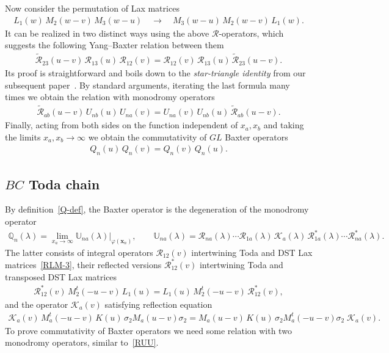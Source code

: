 \documentclass[11pt]{article}
\numberwithin{equation}{section}
\theoremstyle{plain}
\theoremstyle{definition}
\newcommand{\QQ}{\mathbb{Q}}
\newcommand{\MO}{U}
\newcommand{\MMO}{\mathbb{U}}
\renewcommand{\phi}{\varphi}
\begin{document}
Now consider the permutation of Lax matrices
\begin{align}
	L_1(w) \, M_2(w - v) \, M_3(w - u ) \quad \longrightarrow \quad M_3(w - u) \, M_2(w - v) \, L_1(w).
\end{align}
It can be realized in two distinct ways using the above $\mathcal{R}$-operators, which suggests the following Yang--Baxter relation between them
\begin{align}\label{RhRR}
	\widetilde{\mathcal{R}}_{23}(u - v) \, \mathcal{R}_{13}(u) \, \mathcal{R}_{12}(v) = \mathcal{R}_{12}(v) \, \mathcal{R}_{13}(u) \, \widetilde{\mathcal{R}}_{23}(u - v).
\end{align}
Its proof is straightforward and boils down to the \textit{star-triangle identity} from our subsequent paper~\cite{BDK}. By standard arguments, iterating the last formula many times we obtain the relation with monodromy operators
\begin{align} \label{RUU}
	\widetilde{\mathcal{R}}_{ab}(u - v) \, \MO_{nb}(u) \, \MO_{na}(v) = \MO_{na}(v) \, \MO_{nb}(u) \, \widetilde{\mathcal{R}}_{a b}(u - v).
\end{align}
Finally, acting from both sides on the function independent of $x_a, x_b$ and taking the limits $x_a, x_b \to \infty$ we obtain the commutativity of $GL$ Baxter operators
\begin{align}
	Q_n(u) \, Q_n(v) = Q_n(v) \, Q_n(u).
\end{align}

\subsection{$BC$ Toda chain}

By definition~\eqref{Q-def}, the Baxter operator is the degeneration of the monodromy operator
\begin{align} \label{Q-def-2}
	\QQ_n(\lambda) = \lim_{x_{a} \to \infty} \MMO_{n a}(\lambda) \bigr|_{\phi(\bm{x}_n)}, \qquad \MMO_{n a}(\lambda) = \mathcal{R}_{n a}(\lambda) \cdots \mathcal{R}_{1 a}(\lambda) \, \mathcal{K}_a(\lambda) \, \mathcal{R}^*_{1 a}(\lambda) \cdots \mathcal{R}^*_{n a}(\lambda).
\end{align}
The latter consists of integral operators $\mathcal{R}_{12}(v)$ intertwining Toda and DST Lax matrices~\eqref{RLM-3}, their reflected versions $\mathcal{R}^*_{12}(v)$ intertwining Toda and transposed DST Lax matrices
\begin{align}
	\mathcal{R}^*_{12}(v) \, M^t_2(-u-v) \, L_1(u) = L_1(u ) \, M^t_2(-u-v) \, \mathcal{R}^*_{12}(v),
\end{align}
and the operator $\mathcal{K}_a(v)$ satisfying reflection equation
\begin{align}\label{KMKM3}
	\mathcal{K}_a(v) \, M_a^t(-u-v) \, K(u) \, \sigma_2 M_a(u - v) \sigma_2 = M_a(u - v) \, K(u) \, \sigma_2 M_a^t(-u -v) \sigma_2 \; \mathcal{K}_a(v).
\end{align}
To prove commutativity of Baxter operators we need some relation with two monodromy operators, similar to~\eqref{RUU}.
\end{document}
